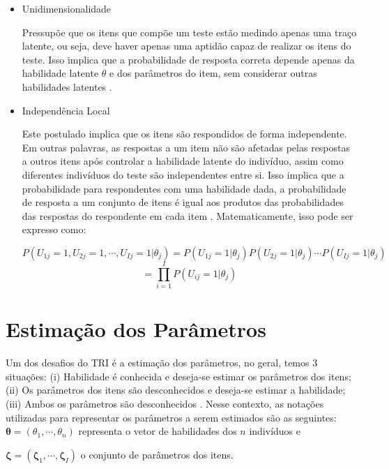 \begin{itemize}
	
\item  Unidimensionalidade

Pressupõe que os itens que compõe um teste estão medindo apenas uma traço latente, ou seja, deve haver apenas uma aptidão capaz de realizar os itens do teste. Isso implica que a probabilidade de resposta correta depende apenas da habilidade latente $\theta$ e dos parâmetros do item, sem considerar outras habilidades latentes \cite{pasquali1996}.

\item  Independência Local

Este postulado implica que os itens são respondidos de forma independente. Em outras palavras, as respostas a um item não são afetadas pelas respostas a outros itens após controlar a habilidade latente do indivíduo, assim como diferentes indivíduos do teste são independentes entre si. Isso implica que a probabilidade para respondentes com uma habilidade dada, a probabilidade de resposta a um conjunto de itens é igual aos produtos das probabilidades das respostas do respondente em cada item \cite{pasquali1996}. Matematicamente, isso pode ser expresso como:


\[
 P(U_{1j} = 1, U_{2j} = 1, \cdots, U_{Ij} = 1 |\theta_j) = 
 P(U_{1j} = 1|\theta_j)  P(U_{2j} = 1|\theta_j) \cdots P(U_{Ij} = 1|\theta_j) 
\] 
\[
 = \prod_{i=1}^{I}P(U_{ij} = 1|\theta_j) 
\]

\end{itemize}
\section{Estimação dos Parâmetros}



Um dos desafios do TRI é a estimação dos parâmetros, no geral, temos 3 situações:  (i) Habilidade é conhecida e deseja-se estimar os parâmetros dos itens; (ii) Os parâmetros dos itens são desconhecidos e deseja-se estimar a habilidade; (iii) Ambos os parâmetros são desconhecidos \cite{de2000teoria}.  Nesse contexto, as notações utilizadas para representar os parâmetros a serem estimados são as seguintes:\\


\noindent $ \boldsymbol{\theta} = (\theta_1, \cdots, \theta_n) $  representa o vetor de habilidades dos $n$ indivíduos e

\noindent $ \boldsymbol{\zeta} = (\boldsymbol{\zeta}_1, \cdots, \boldsymbol{\zeta}_I) $ o conjunto de parâmetros dos itens.

